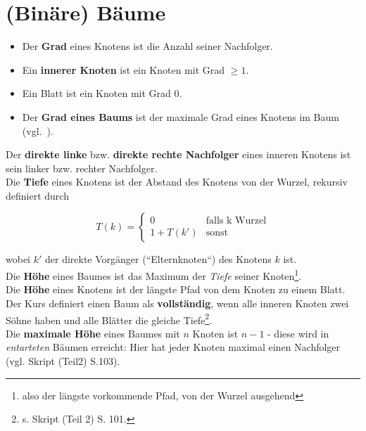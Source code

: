 \section{(Binäre) Bäume}


\begin{itemize}
    \item Der \textbf{Grad} eines Knotens ist die Anzahl seiner Nachfolger.
    \item Ein \textbf{innerer Knoten} ist ein Knoten mit Grad $\geq 1$.
    \item Ein Blatt ist ein Knoten mit Grad $0$.
    \item Der \textbf{Grad eines Baums} ist der maximale Grad eines Knotens im Baum (vgl.~\cite[102]{GD18c}).
\end{itemize}


\noindent
Der \textbf{direkte linke} bzw. \textbf{direkte rechte Nachfolger} eines inneren Knotens ist sein linker bzw. rechter Nachfolger.\\

\noindent
Die \textbf{Tiefe} eines Knotens ist der Abstand des Knotens von der Wurzel, rekursiv definiert durch

\begin{equation}
    T(k) = \begin{cases}
            0 &\text{falls k Wurzel}\\
            1 + T(k') &\text{sonst}
    \end{cases}
\end{equation}

wobei $k'$ der direkte Vorgänger (``Elternknoten``) des Knotens $k$ ist.\\

\noindent
Die \textbf{Höhe} eines Baumes ist das Maximum der \textit{Tiefe} seiner Knoten\footnote{also der längste vorkommende Pfad,  von der Wurzel ausgehend}.\\

\noindent
Die \textbf{Höhe} eines Knotens ist der längste Pfad von dem Knoten zu einem Blatt.\\

\noindent
Der Kurs definiert einen Baum als \textbf{vollständig}, wenn alle inneren Knoten zwei Söhne haben und alle Blätter die gleiche Tiefe\footnote{
    s. Skript (Teil 2) S. 101.
}.\\

\noindent
Die \textbf{maximale Höhe} eines Baumes mit $n$ Knoten ist $n - 1$ - diese wird in \textit{entarteten} Bäumen erreicht: Hier hat jeder Knoten maximal einen Nachfolger (vgl. Skript (Teil2) S.103).\\

